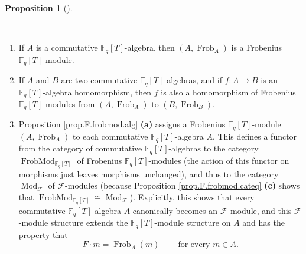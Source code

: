 \documentclass[numbers=enddot,12pt,final,onecolumn,notitlepage]{scrartcl}%
\theoremstyle{definition}
\newtheorem{prop}[theo]{Proposition}
\newenvironment{proposition}[1][]
{\begin{prop}[#1]\begin{leftbar}}
{\end{leftbar}\end{prop}}
\begin{document}
\begin{proposition}
\label{prop.F.frobmod.alg}\ \ 

\begin{enumerate}
\item[\textbf{(a)}] If $A$ is a commutative $\mathbb{F}_{q}\left[  T\right]
$-algebra, then $\left(  A,\operatorname*{Frob}\nolimits_{A}\right)  $ is a
Frobenius $\mathbb{F}_{q}\left[  T\right]  $-module.

\item[\textbf{(b)}] If $A$ and $B$ are two commutative $\mathbb{F}_{q}\left[
T\right]  $-algebras, and if $f:A\rightarrow B$ is an $\mathbb{F}_{q}\left[
T\right]  $-algebra homomorphism, then $f$ is also a homomorphism of Frobenius
$\mathbb{F}_{q}\left[  T\right]  $-modules from $\left(
A,\operatorname*{Frob}\nolimits_{A}\right)  $ to $\left(
B,\operatorname*{Frob}\nolimits_{B}\right)  $.

\item[\textbf{(c)}] Proposition \ref{prop.F.frobmod.alg} \textbf{(a)} assigns
a Frobenius $\mathbb{F}_{q}\left[  T\right]  $-module $\left(
A,\operatorname*{Frob}\nolimits_{A}\right)  $ to each commutative
$\mathbb{F}_{q}\left[  T\right]  $-algebra $A$. This defines a functor from
the category of commutative $\mathbb{F}_{q}\left[  T\right]  $-algebras to the
category $\operatorname*{FrobMod}\nolimits_{\mathbb{F}_{q}\left[  T\right]  }$
of Frobenius $\mathbb{F}_{q}\left[  T\right]  $-modules (the action of this
functor on morphisms just leaves morphisms unchanged), and thus to the
category $\operatorname*{Mod}\nolimits_{\mathcal{F}}$ of $\mathcal{F}$-modules
(because Proposition \ref{prop.F.frobmod.cateq} \textbf{(c)} shows that
$\operatorname*{FrobMod}\nolimits_{\mathbb{F}_{q}\left[  T\right]  }%
\cong\operatorname*{Mod}\nolimits_{\mathcal{F}}$). Explicitly, this shows that
every commutative $\mathbb{F}_{q}\left[  T\right]  $-algebra $A$ canonically
becomes an $\mathcal{F}$-module, and this $\mathcal{F}$-module structure
extends the $\mathbb{F}_{q}\left[  T\right]  $-module structure on $A$ and has
the property that
\[
F\cdot m=\operatorname*{Frob}\nolimits_{A}\left(  m\right)
\ \ \ \ \ \ \ \ \ \ \text{for every }m\in A.
\]

\end{enumerate}
\end{proposition}
\end{document}

